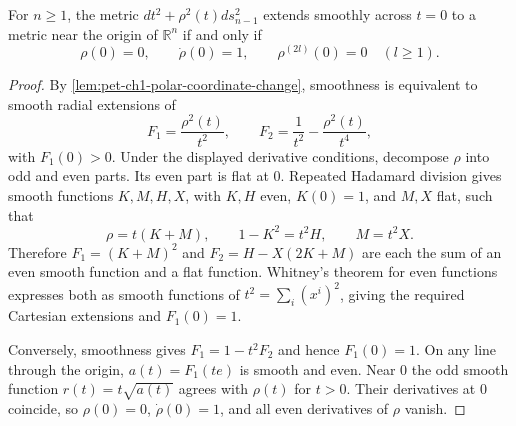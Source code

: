\begin{theorem}
  \label{thm:pet-ch1-smoothness-criterion}


  For $n\ge1$, the metric
  $dt^2+\rho^2(t)ds_{n-1}^2$ extends smoothly across $t=0$ to a metric near
  the origin of $\mathbb{R}^n$ if and only if
  \[
    \rho(0)=0,
    \qquad \dot\rho(0)=1,
    \qquad \rho^{(2l)}(0)=0\quad(l\ge1).
  \]
\end{theorem}
\begin{proof}

  \sketch
  By \cref{lem:pet-ch1-polar-coordinate-change}, smoothness is equivalent to
  smooth radial extensions of
  \[
    F_1=\frac{\rho^2(t)}{t^2},
    \qquad
    F_2=\frac1{t^2}-\frac{\rho^2(t)}{t^4},
  \]
  with $F_1(0)>0$. Under the displayed derivative conditions, decompose
  $\rho$ into odd and even parts. Its even part is flat at $0$. Repeated
  Hadamard division gives smooth functions $K,M,H,X$, with $K,H$ even,
  $K(0)=1$, and $M,X$ flat, such that
  \[
    \rho=t(K+M),\qquad 1-K^2=t^2H,
    \qquad M=t^2X.
  \]
  Therefore $F_1=(K+M)^2$ and $F_2=H-X(2K+M)$ are each the sum of an even
  smooth function and a flat function. Whitney's theorem for even functions
  expresses both as smooth functions of $t^2=\sum_i(x^i)^2$, giving the
  required Cartesian extensions and $F_1(0)=1$.

  Conversely, smoothness gives $F_1=1-t^2F_2$ and hence $F_1(0)=1$. On any
  line through the origin, $a(t)=F_1(te)$ is smooth and even. Near $0$ the
  odd smooth function $r(t)=t\sqrt{a(t)}$ agrees with $\rho(t)$ for $t>0$.
  Their derivatives at $0$ coincide, so $\rho(0)=0$, $\dot\rho(0)=1$, and
  all even derivatives of $\rho$ vanish.
\end{proof}

